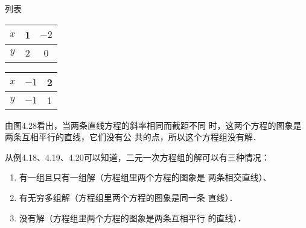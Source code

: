 \begin{solution}
    列表
    \begin{multicols}{2}
       \begin{center}
           \begin{tabular}{c|cc}
              \hline
               $x$&1&$-2$\\
               \hline
               $y$&2&0\\
               \hline
           \end{tabular}
       \end{center}
       \begin{center}
           \begin{tabular}{c|cc}
               \hline
               $x$&$-1$&2\\
               \hline
               $y$&$-1$&1\\
               \hline
           \end{tabular}
       \end{center}
   \end{multicols}
   \begin{figure}[htp]
    \centering
{}
    \caption{}
\end{figure}

由图4.28看出，当两条直线方程的斜率相同而截距不同
时，这两个方程的图象是两条互相平行的直线，它们没有公
共的点，所以这个方程组没有解．
\end{solution}


从例4.18、4.19、4.20可以知道，二元一次方程组的解可以有三种情况：
\begin{enumerate}
   \item 有一组且只有一组解（方程组里两个方程的图象是
两条相交直线）、
\item 有无穷多组解（方程组里两个方程的图象是同一条
直线）．
\item 没有解（方程组里两个方程的图象是两条互相平行
的直线）． 
\end{enumerate}

